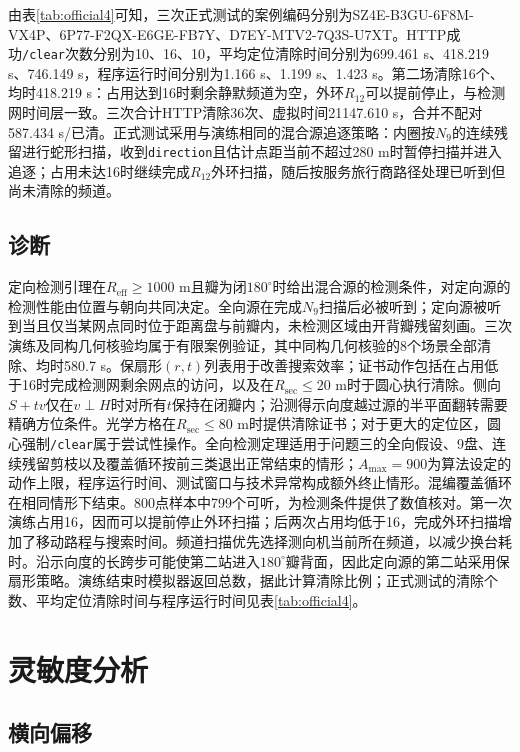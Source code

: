 \documentclass{cumcmthesis}
\begin{document}
由表\ref{tab:official4}可知，三次正式测试的案例编码分别为SZ4E-B3GU-6F8M-VX4P、6P77-F2QX-E6GE-FB7Y、D7EY-MTV2-7Q3S-U7XT。HTTP成功\texttt{/clear}次数分别为10、16、10，平均定位清除时间分别为699.461 s、418.219 s、746.149 s，程序运行时间分别为1.166 s、1.199 s、1.423 s。第二场清除16个、均时418.219 s：占用达到16时剩余静默频道为空，外环$R_{12}$可以提前停止，与检测网时间层一致。三次合计HTTP清除36次、虚拟时间21147.610 s，合并不配对587.434 s/已清。正式测试采用与演练相同的混合源追逐策略：内圈按$N_9$的连续残留进行蛇形扫描，收到\texttt{direction}且估计点距当前不超过280 m时暂停扫描并进入追逐；占用未达16时继续完成$R_{12}$外环扫描，随后按服务旅行商路径处理已听到但尚未清除的频道。

\FloatBarrier
\subsection{诊断}

定向检测引理在$R_{\mathrm{eff}}\ge 1000$ m且瓣为闭$180^\circ$时给出混合源的检测条件，对定向源的检测性能由位置与朝向共同决定。全向源在完成$N_9$扫描后必被听到；定向源被听到当且仅当某网点同时位于距离盘与前瓣内，未检测区域由开背瓣残留刻画。三次演练及同构几何核验均属于有限案例验证，其中同构几何核验的8个场景全部清除、均时580.7 s。保扇形$(r,t)$列表用于改善搜索效率；证书动作包括在占用低于16时完成检测网剩余网点的访问，以及在$R_{\mathrm{sec}}\le 20$ m时于圆心执行清除。侧向$S+tv$仅在$v\perp H$时对所有$t$保持在闭瓣内；沿测得示向度越过源的半平面翻转需要精确方位条件。光学方格在$R_{\mathrm{sec}}\le 80$ m时提供清除证书；对于更大的定位区，圆心强制\texttt{/clear}属于尝试性操作。全向检测定理适用于问题三的全向假设、9盘、连续残留剪枝以及覆盖循环按前三类退出正常结束的情形；$A_{\max}=900$为算法设定的动作上限，程序运行时间、测试窗口与技术异常构成额外终止情形。混编覆盖循环在相同情形下结束。800点样本中799个可听，为检测条件提供了数值核对。第一次演练占用16，因而可以提前停止外环扫描；后两次占用均低于16，完成外环扫描增加了移动路程与搜索时间。频道扫描优先选择测向机当前所在频道，以减少换台耗时。沿示向度的长跨步可能使第二站进入$180^\circ$瓣背面，因此定向源的第二站采用保扇形策略。演练结束时模拟器返回总数，据此计算清除比例；正式测试的清除个数、平均定位清除时间与程序运行时间见表\ref{tab:official4}。

\section{灵敏度分析}

\subsection{横向偏移}
\end{document}
